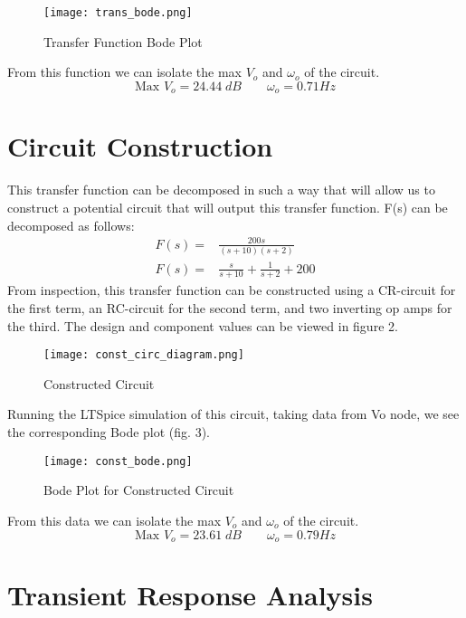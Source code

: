\documentclass[11pt]{article}
\begin{document}
\begin{figure}[H]
    \centering
    \texttt{[image: trans\_bode.png]}
    \caption{Transfer Function Bode Plot}
    \label{fig:Transfer Function Bode Plot}
\end{figure}
From this function we can isolate the max $V_o$ and $\omega_o$ of the circuit.
$$\text{Max }V_o = 24.44\;dB\qquad \omega_o = 0.71 Hz$$


\section*{\textcolor{mycolor}{Circuit Construction}}
This transfer function can be decomposed in such a way that will allow us to construct a potential circuit that will output this transfer function. F(s) can be decomposed as follows:
\begin{align*}
    F(s) =& \frac{200s}{(s+10)(s+2)}\\
    F(s) =& \frac{s}{s+10}+\frac{1}{s+2}+200
\end{align*}
From inspection, this transfer function can be constructed using a CR-circuit for the first term, an RC-circuit for the second term, and two inverting
op amps for the third. The design and component values can be viewed in figure 2.
\begin{figure}[H]
    \centering
    \texttt{[image: const\_circ\_diagram.png]}
    \caption{Constructed Circuit}
    \label{fig:Constructed Circuit}
\end{figure}
Running the LTSpice simulation of this circuit, taking data from Vo node, we see the corresponding Bode plot (fig. 3).
\begin{figure}[H]
    \centering
    \texttt{[image: const\_bode.png]}
    \caption{Bode Plot for Constructed Circuit}
    \label{fig:Bode Constructed Circuit}
\end{figure}
From this data we can isolate the max $V_o$ and $\omega_o$ of the circuit.
$$\text{Max }V_o = 23.61\;dB\qquad \omega_o = 0.79 Hz$$

\section*{\textcolor{mycolor}{Transient Response Analysis}}
\end{document}
